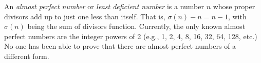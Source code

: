 \documentclass[12pt]{article}
\begin{document}
An {\em almost perfect number} or {\em least deficient number} is a number $n$ whose proper divisors add up to just one less than itself. That is, $\sigma(n) - n = n - 1$, with $\sigma(n)$ being the sum of divisors function. Currently, the only known almost perfect numbers are the integer powers of 2 (e.g., 1, 2, 4, 8, 16, 32, 64, 128, etc.) No one has been able to prove that there are almost perfect numbers of a different form.
\end{document}
